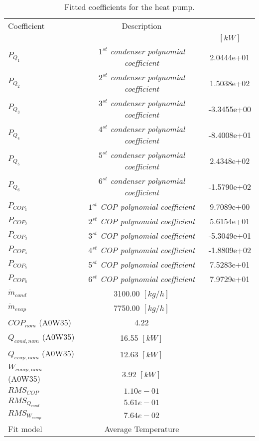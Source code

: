 \documentclass[english]{SPFShortReport}
\author{Dani Carbonell}
\begin{document}
\begin{table}[!ht]
\begin{small}
\caption{Fitted coefficients for the heat pump.}
\begin{center}
\resizebox{12cm}{!} 
{
\begin{tabular}{l | c c } 
\hline
\hline
Coefficient &Description & \\ 
 & &$[kW]$\\ 
\hline
$P_{Q_{1}}$ & \emph{$1^{st}$ condenser polynomial coefficient}  & 2.0444e+01    \\ 
$P_{Q_{2}}$ & \emph{$2^{st}$ condenser polynomial coefficient}  & 1.5038e+02    \\ 
$P_{Q_{3}}$ & \emph{$3^{st}$ condenser polynomial coefficient}  & -3.3455e+00    \\ 
$P_{Q_{4}}$ & \emph{$4^{st}$ condenser polynomial coefficient}  & -8.4008e+01    \\ 
$P_{Q_{5}}$ & \emph{$5^{st}$ condenser polynomial coefficient}  & 2.4348e+02    \\ 
$P_{Q_{6}}$ & \emph{$6^{st}$ condenser polynomial coefficient}  & -1.5790e+02    \\ 
\hline
$P_{COP_{1}}$ & \emph{$1^{st}$ COP polynomial coefficient}  & 9.7089e+00    \\ 
$P_{COP_{2}}$ & \emph{$2^{st}$ COP polynomial coefficient}  & 5.6154e+01    \\ 
$P_{COP_{3}}$ & \emph{$3^{st}$ COP polynomial coefficient}  & -5.3049e+01    \\ 
$P_{COP_{4}}$ & \emph{$4^{st}$ COP polynomial coefficient}  & -1.8809e+02    \\ 
$P_{COP_{5}}$ & \emph{$5^{st}$ COP polynomial coefficient}  & 7.5283e+01    \\ 
$P_{COP_{6}}$ & \emph{$6^{st}$ COP polynomial coefficient}  & 7.9729e+01    \\ 
\hline
$\dot m_{cond}$ & 3100.00 $[kg/h]$ \\ 
$\dot m_{evap}$ & 7750.00 $[kg/h]$ \\ 
\hline
$COP_{nom}$ (A0W35)& 4.22 \\ 
$Q_{cond,nom}$ (A0W35)& 16.55 $[kW]$\\ 
$Q_{evap,nom}$ (A0W35)& 12.63 $[kW]$\\ 
$W_{comp,nom}$ (A0W35)& 3.92 $[kW]$\\ 
\hline
 $RMS_{COP}$ & $1.10e-01$ \\ 
 $RMS_{Q_{cond}}$ & $5.61e-01$ \\ 
 $RMS_{W_{comp}}$ & $7.64e-02$ \\ 
\hline
Fit model & Average Temperature\\ 
\hline
\hline
\end{tabular}
}
\label{CoefTable}
\end{center}
\end{small}
\end{table}
\end{document}
